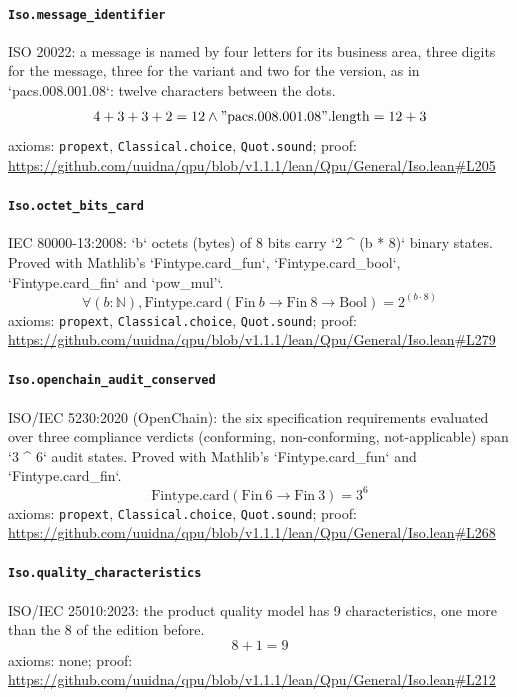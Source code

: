 \documentclass[11pt]{article}
\begin{document}
\paragraph{\texttt{Iso.message\_identifier}}
ISO 20022: a message is named by four letters for its business area, three digits for the message, three for the variant and two for the version, as in `pacs.008.001.08`: twelve characters between the dots.
\[ 4 + 3 + 3 + 2 = 12 \land "\mathrm{pacs.008.001.08}"\mathrm{.length} = 12 + 3 \]
\noindent axioms: \texttt{propext}, \texttt{Classical.choice}, \texttt{Quot.sound}; proof: \url{https://github.com/uuidna/qpu/blob/v1.1.1/lean/Qpu/General/Iso.lean\#L205}

\paragraph{\texttt{Iso.octet\_bits\_card}}
IEC 80000-13:2008: `b` octets (bytes) of 8 bits carry `2 \^{} (b * 8)` binary states. Proved with Mathlib's `Fintype.card\_fun`, `Fintype.card\_bool`, `Fintype.card\_fin` and `pow\_mul'`.
\[ \forall (b : \mathbb{N}), \mathrm{Fintype.card} (\mathrm{Fin}\ b \to \mathrm{Fin}\ 8 \to \mathrm{Bool}) = 2 ^{(b \cdot 8)} \]
\noindent axioms: \texttt{propext}, \texttt{Classical.choice}, \texttt{Quot.sound}; proof: \url{https://github.com/uuidna/qpu/blob/v1.1.1/lean/Qpu/General/Iso.lean\#L279}

\paragraph{\texttt{Iso.openchain\_audit\_conserved}}
ISO/IEC 5230:2020 (OpenChain): the six specification requirements evaluated over three compliance verdicts (conforming, non-conforming, not-applicable) span `3 \^{} 6` audit states. Proved with Mathlib's `Fintype.card\_fun` and `Fintype.card\_fin`.
\[ \mathrm{Fintype.card} (\mathrm{Fin}\ 6 \to \mathrm{Fin}\ 3) = 3 ^{6} \]
\noindent axioms: \texttt{propext}, \texttt{Classical.choice}, \texttt{Quot.sound}; proof: \url{https://github.com/uuidna/qpu/blob/v1.1.1/lean/Qpu/General/Iso.lean\#L268}

\paragraph{\texttt{Iso.quality\_characteristics}}
ISO/IEC 25010:2023: the product quality model has 9 characteristics, one more than the 8 of the edition before.
\[ 8 + 1 = 9 \]
\noindent axioms: none; proof: \url{https://github.com/uuidna/qpu/blob/v1.1.1/lean/Qpu/General/Iso.lean\#L212}
\end{document}
